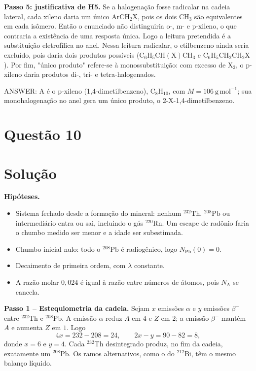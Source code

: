 \documentclass{article}%
\begin{document}
\textbf{Passo 5: justificativa de H5.} Se a halogenação fosse radicalar na cadeia lateral, cada xileno daria um único $\mathrm{ArCH_2X}$, pois os dois $\mathrm{CH_3}$ são equivalentes em cada isômero. Então o enunciado não distinguiria o-, m- e p-xileno, o que contraria a existência de uma resposta única. Logo a leitura pretendida é a substituição eletrofílica no anel. Nessa leitura radicalar, o etilbenzeno ainda seria excluído, pois daria dois produtos possíveis ($\mathrm{C_6H_5CH(X)CH_3}$ e $\mathrm{C_6H_5CH_2CH_2X}$). Por fim, "único produto" refere-se à monossubstituição: com excesso de $\mathrm{X_2}$, o p-xileno daria produtos di-, tri- e tetra-halogenados.

ANSWER: A é o p-xileno (1,4-dimetilbenzeno), $\mathrm{C_8H_{10}}$, com $M=106\ \mathrm{g\,mol^{-1}}$; sua monohalogenação no anel gera um único produto, o 2-X-1,4-dimetilbenzeno.%
\newpage%
\section*{Questão 10}

\section*{Solução}

\textbf{Hipóteses.}
\begin{itemize}
\item Sistema fechado desde a formação do mineral: nenhum ${}^{232}\mathrm{Th}$, ${}^{208}\mathrm{Pb}$ ou intermediário entra ou sai, incluindo o gás ${}^{220}\mathrm{Rn}$. Um escape de radônio faria o chumbo medido ser menor e a idade ser subestimada.
\item Chumbo inicial nulo: todo o ${}^{208}\mathrm{Pb}$ é radiogênico, logo $N_{\mathrm{Pb}}(0)=0$.
\item Decaimento de primeira ordem, com $\lambda$ constante.
\item A razão molar $0{,}024$ é igual à razão entre números de átomos, pois $N_{\mathrm{A}}$ se cancela.
\end{itemize}

\textbf{Passo 1 -- Estequiometria da cadeia.} Sejam $x$ emissões $\alpha$ e $y$ emissões $\beta^-$ entre ${}^{232}\mathrm{Th}$ e ${}^{208}\mathrm{Pb}$. A emissão $\alpha$ reduz $A$ em $4$ e $Z$ em $2$; a emissão $\beta^-$ mantém $A$ e aumenta $Z$ em $1$. Logo
\[
4x=232-208=24,\qquad 2x-y=90-82=8,
\]
donde $x=6$ e $y=4$. Cada ${}^{232}\mathrm{Th}$ desintegrado produz, no fim da cadeia, exatamente um ${}^{208}\mathrm{Pb}$. Os ramos alternativos, como o do ${}^{212}\mathrm{Bi}$, têm o mesmo balanço líquido.
\end{document}
